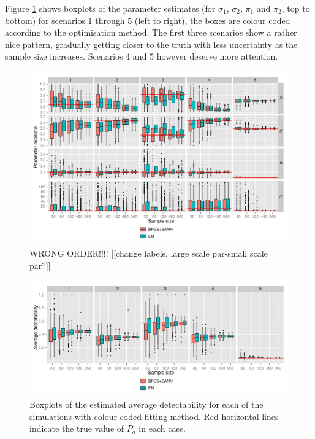 Figure \ref{mmds-nocov-boxplots} shows boxplots of the parameter estimates (for $\sigma_1$, $\sigma_2$, $\pi_1$ and $\pi_2$, top to bottom) for scenarios 1 through 5 (left to right), the boxes are colour coded according to the optimisation method. The first three scenarios show a rather nice pattern, gradually getting closer to the truth with less uncertainty as the sample size increases. Scenarios 4 and 5 however deserve more attention.

\begin{figure}
\centering
\includegraphics[width=6in]{mix/figs/nocov-boxplots.pdf}
\caption{WRONG ORDER!!!! [[change labels, large scale par-small scale par?]]}
\label{mmds-nocov-boxplots}
\end{figure}

\begin{figure}
\centering
\includegraphics[width=6in]{mix/figs/nocov-pa-boxplots.pdf}
\caption{Boxplots of the estimated average detectability for each of the simulations with colour-coded fitting method. Red horizontal lines indicate the true value of $P_a$ in each case.}
\label{mmds-nocov-pa-boxplots}
\end{figure}


